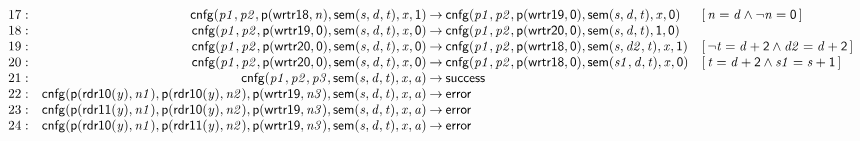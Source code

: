 \documentclass[a4paper]{article}
\newcommand{\symb}[1]{\mathsf{#1}}
\newcommand{\var}[1]{\mathit{#1}}
\newcommand{\Constraint}[1]{[\, #1 \,]}
\begin{document}
\begin{landscape}
\[\begin{array}{rr@{\>}c@{\>}ll}
\mathrm{17} : 
 & \symb{cnfg}(\var{p1},\var{p2},\symb{p}(\symb{wrtr18},\var{n}),\symb{sem}(\var{s},\var{d},\var{t}),\var{x},\symb{1})
 & \to 
 & \symb{cnfg}(\var{p1},\var{p2},\symb{p}(\symb{wrtr19},\symb{0}),\symb{sem}(\var{s},\var{d},\var{t}),\var{x},\symb{0})
 & \Constraint{\var{n} = \var{d} \land \neg \var{n} = \symb{0}}\\

\mathrm{18} : 
 & \symb{cnfg}(\var{p1},\var{p2},\symb{p}(\symb{wrtr19},\symb{0}),\symb{sem}(\var{s},\var{d},\var{t}),\var{x},\symb{0})
 & \to 
 & \symb{cnfg}(\var{p1},\var{p2},\symb{p}(\symb{wrtr20},\symb{0}),\symb{sem}(\var{s},\var{d},\var{t}),\symb{1},\symb{0})\\

\mathrm{19} : 
 & \symb{cnfg}(\var{p1},\var{p2},\symb{p}(\symb{wrtr20},\symb{0}),\symb{sem}(\var{s},\var{d},\var{t}),\var{x},\symb{0})
 & \to 
 & \symb{cnfg}(\var{p1},\var{p2},\symb{p}(\symb{wrtr18},\symb{0}),\symb{sem}(\var{s},\var{d2},\var{t}),\var{x},\symb{1})
 & \Constraint{\neg \var{t} = \var{d} + \symb{2} \land \var{d2} = \var{d} + \symb{2}}\\

\mathrm{20} : 
 & \symb{cnfg}(\var{p1},\var{p2},\symb{p}(\symb{wrtr20},\symb{0}),\symb{sem}(\var{s},\var{d},\var{t}),\var{x},\symb{0})
 & \to 
 & \symb{cnfg}(\var{p1},\var{p2},\symb{p}(\symb{wrtr18},\symb{0}),\symb{sem}(\var{s1},\var{d},\var{t}),\var{x},\symb{0})
 & \Constraint{\var{t} = \var{d} + \symb{2} \land \var{s1} = \var{s} + \symb{1}}\\

\mathrm{21} : 
 & \symb{cnfg}(\var{p1},\var{p2},\var{p3},\symb{sem}(\var{s},\var{d},\var{t}),\var{x},\var{a})
 & \to 
 & \symb{success}\\

\mathrm{22} : 
 & \symb{cnfg}(\symb{p}(\symb{rdr10}(\var{y}),\var{n1}),\symb{p}(\symb{rdr10}(\var{y}),\var{n2}),\symb{p}(\symb{wrtr19},\var{n3}),\symb{sem}(\var{s},\var{d},\var{t}),\var{x},\var{a})
 & \to 
 & \symb{error}\\

\mathrm{23} : 
 & \symb{cnfg}(\symb{p}(\symb{rdr11}(\var{y}),\var{n1}),\symb{p}(\symb{rdr10}(\var{y}),\var{n2}),\symb{p}(\symb{wrtr19},\var{n3}),\symb{sem}(\var{s},\var{d},\var{t}),\var{x},\var{a})
 & \to 
 & \symb{error}\\

\mathrm{24} : 
 & \symb{cnfg}(\symb{p}(\symb{rdr10}(\var{y}),\var{n1}),\symb{p}(\symb{rdr11}(\var{y}),\var{n2}),\symb{p}(\symb{wrtr19},\var{n3}),\symb{sem}(\var{s},\var{d},\var{t}),\var{x},\var{a})
 & \to 
 & \symb{error}\\


\end{array}\]
\end{landscape}
\end{document}
